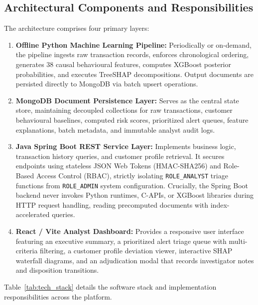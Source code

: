 \documentclass[conference]{IEEEtran}
\begin{document}
\subsection{Architectural Components and Responsibilities}
The architecture comprises four primary layers:
\begin{enumerate}
    \item \textbf{Offline Python Machine Learning Pipeline:} Periodically or on-demand, the pipeline ingests raw transaction records, enforces chronological ordering, generates 38 causal behavioural features, computes XGBoost posterior probabilities, and executes TreeSHAP decompositions. Output documents are persisted directly to MongoDB via batch upsert operations.
    \item \textbf{MongoDB Document Persistence Layer:} Serves as the central state store, maintaining decoupled collections for raw transactions, customer behavioural baselines, computed risk scores, prioritized alert queues, feature explanations, batch metadata, and immutable analyst audit logs.
    \item \textbf{Java Spring Boot REST Service Layer:} Implements business logic, transaction history queries, and customer profile retrieval. It secures endpoints using stateless JSON Web Tokens (HMAC-SHA256) and Role-Based Access Control (RBAC), strictly isolating \texttt{ROLE\_ANALYST} triage functions from \texttt{ROLE\_ADMIN} system configuration. Crucially, the Spring Boot backend never invokes Python runtimes, C-APIs, or XGBoost libraries during HTTP request handling, reading precomputed documents with index-accelerated queries.
    \item \textbf{React / Vite Analyst Dashboard:} Provides a responsive user interface featuring an executive summary, a prioritized alert triage queue with multi-criteria filtering, a customer profile deviation viewer, interactive SHAP waterfall diagrams, and an adjudication modal that records investigator notes and disposition transitions.
\end{enumerate}

Table~\ref{tab:tech_stack} details the software stack and implementation responsibilities across the platform.
\end{document}
